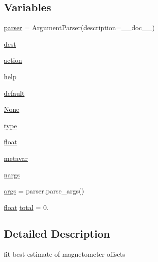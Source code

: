 \subsection*{Variables}
\begin{DoxyCompactItemize}
\item 
\mbox{\hyperlink{namespacepymavlink_1_1tools_1_1magfit_a6d0df36a846badadc38e61187a34d983}{parser}} = Argument\+Parser(description=\+\_\+\+\_\+doc\+\_\+\+\_\+)
\item 
\mbox{\hyperlink{namespacepymavlink_1_1tools_1_1magfit_ab13797777b38a0ec1da04fc627f82e41}{dest}}
\item 
\mbox{\hyperlink{namespacepymavlink_1_1tools_1_1magfit_a2e1257f700661cd49011aa5560b83c33}{action}}
\item 
\mbox{\hyperlink{namespacepymavlink_1_1tools_1_1magfit_a61c609b29eadab7d3e1a4bb56151d329}{help}}
\item 
\mbox{\hyperlink{namespacepymavlink_1_1tools_1_1magfit_af3df9e9d8eb7489c4c33ab7334f78a79}{default}}
\item 
\mbox{\hyperlink{namespacepymavlink_1_1tools_1_1magfit_a69d7a14e5bd149f522bbff47a16358f5}{None}}
\item 
\mbox{\hyperlink{namespacepymavlink_1_1tools_1_1magfit_a1df98baf6bc890d12b6fb2ff30f4da46}{type}}
\item 
\mbox{\hyperlink{namespacepymavlink_1_1tools_1_1magfit_ae9ebf0687869ceb9dd1551f626a903eb}{float}}
\item 
\mbox{\hyperlink{namespacepymavlink_1_1tools_1_1magfit_aafe560f3b36b24501e13ec291e683139}{metavar}}
\item 
\mbox{\hyperlink{namespacepymavlink_1_1tools_1_1magfit_a07fda2900aadc9d19417fb63ef309e60}{nargs}}
\item 
\mbox{\hyperlink{namespacepymavlink_1_1tools_1_1magfit_a9a02611f23b50f1c98394b7e9f20d666}{args}} = parser.\+parse\+\_\+args()
\item 
\mbox{\hyperlink{namespacepymavlink_1_1tools_1_1magfit_ae9ebf0687869ceb9dd1551f626a903eb}{float}} \mbox{\hyperlink{namespacepymavlink_1_1tools_1_1magfit_a07593f30feed0b1ca4f16deba579e878}{total}} = 0.
\end{DoxyCompactItemize}


\subsection{Detailed Description}
\begin{DoxyVerb}fit best estimate of magnetometer offsets
\end{DoxyVerb}
 

